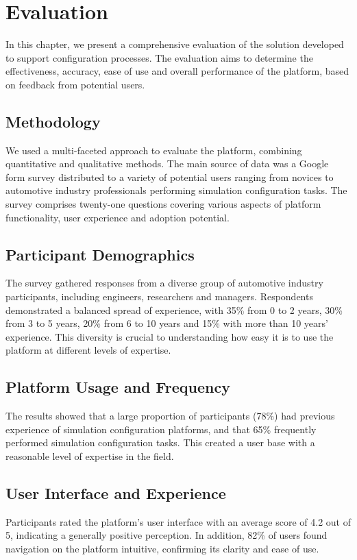 \section{Evaluation\label{sec:evaluation}}
In this chapter, we present a comprehensive evaluation of the solution developed to support configuration processes. The evaluation aims to determine the effectiveness, accuracy, ease of use and overall performance of the platform, based on feedback from potential users.\\


\subsection{Methodology}
We used a multi-faceted approach to evaluate the platform, combining quantitative and qualitative methods. The main source of data was a Google form survey distributed to a variety of potential users ranging from novices to automotive industry professionals performing simulation configuration tasks. The survey comprises twenty-one questions covering various aspects of platform functionality, user experience and adoption potential.\\


\subsection{Participant Demographics}
The survey gathered responses from a diverse group of automotive industry participants, including engineers, researchers and managers. Respondents demonstrated a balanced spread of experience, with 35\% from 0 to 2 years, 30\% from 3 to 5 years, 20\% from 6 to 10 years and 15\% with more than 10 years' experience. This diversity is crucial to understanding how easy it is to use the platform at different levels of expertise.\\


\subsection{Platform Usage and Frequency}
The results showed that a large proportion of participants (78\%) had previous experience of simulation configuration platforms, and that 65\% frequently performed simulation configuration tasks. This created a user base with a reasonable level of expertise in the field.\\


\subsection{User Interface and Experience}
Participants rated the platform's user interface with an average score of 4.2 out of 5, indicating a generally positive perception. In addition, 82\% of users found navigation on the platform intuitive, confirming its clarity and ease of use.\\


